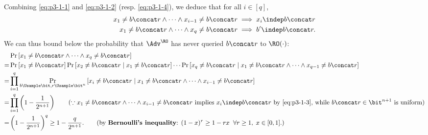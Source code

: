 \begin{answer}[i]
    Combining \eqref{eq:p3-1-1} and \eqref{eq:p3-1-2} (resp. \eqref{eq:p3-1-4}), we deduce that for all $i\in [q]$,
    \begin{align}
        x_1\neq b\concat r\land \cdots \land x_{i-1}\neq b\concat r
        &\implies  x_{i}\indep b\concat r \label{eq:p3-1-3}\\
        x_1\neq b\concat r\land \cdots \land x_{q}\neq b\concat r
        &\implies  b'\indep b\concat r. \label{eq:p3-1-5}
    \end{align}
    We can thus bound below the probability that $\Adv^\RO$ has never queried $b\concat r$ to $\RO(\cdot)$:
    \begin{align}\label{eq:p3-1-6}
        &\Pr\left[x_1\neq b\concat r\land \cdots \land x_{q}\neq b\concat r \right]\notag\\
        =& \Pr\left[x_1\neq b\concat r \right] \Pr\left[x_2\neq b\concat r \mid x_1\neq b\concat r \right]\cdots \Pr\left[x_q\neq b\concat r \mid x_1\neq b\concat r\land \cdots \land x_{q-1}\neq b\concat r \right]\notag\\
        =& \prod_{i=1}^q \Pr_{b\Usample\bit, r\Usample\bit^n}\left[x_i\neq b\concat r \mid x_1\neq b\concat r\land \cdots \land x_{i-1}\neq b\concat r \right]\notag\\
        =& \prod_{i=1}^q \left(1-\frac{1}{2^{n+1}}\right)
        \qquad (\because x_1\neq b\concat r\land \cdots \land x_{i-1}\neq b\concat r \textrm{ implies }  x_i\indep  b\concat r \textrm{ by \eqref{eq:p3-1-3}, while } b\concat r\in\bit^{n+1} \textrm{ is uniform})\notag\\
        =& \left(1-\frac{1}{2^{n+1}}\right)^q
        \ge 1-\frac{q}{2^{n+1}}.
        \qquad (\textrm{by \textbf{Bernoulli's inequality}: } (1-x)^r\ge 1-rx \;\;\forall r\ge 1 ,\; x\in[0,1].)
    \end{align}


\end{answer}
